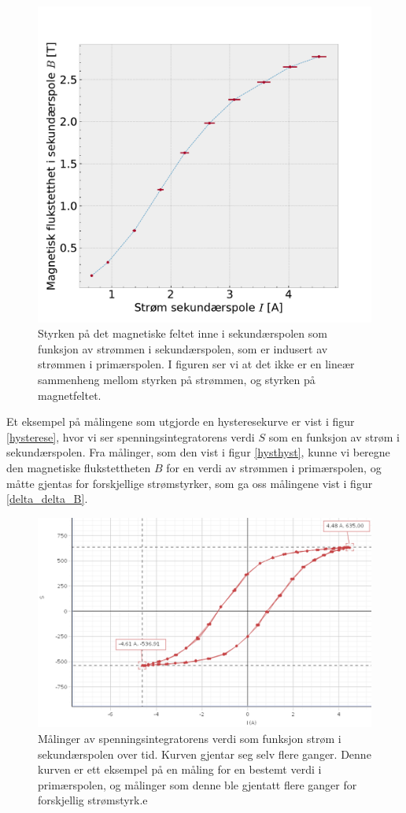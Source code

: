 \documentclass[%
 reprint,
 amsmath,amssymb,
 aps,
 norsk,
]{revtex4-1}
\begin{document}
\begin{figure}[h!]
  \centering
  \includegraphics[scale=0.45]{magnetic_secondary_hysterese.pdf}
  \caption{Styrken på det magnetiske feltet inne i sekundærspolen som funksjon av strømmen i sekundærspolen, som er indusert av strømmen i primærspolen. I figuren ser vi at det ikke er en lineær sammenheng mellom styrken på strømmen, og styrken på magnetfeltet.}
  \label{data_delta_B}
\end{figure}
Et eksempel på målingene som utgjorde en hysteresekurve er vist i figur \vref{hysterese}, hvor vi ser spenningsintegratorens verdi $S$ som en funksjon av strøm i sekundærspolen. Fra målinger, som den vist i figur \vref{hysthyst}, kunne vi beregne den magnetiske flukstettheten $B$ for en verdi av strømmen i primærspolen, og måtte gjentas for forskjellige strømstyrker, som ga oss målingene vist i figur \vref{delta_delta_B}.
\begin{figure}[h!]
  \centering
  \includegraphics[scale=0.25]{Hysterese.png}
  \caption{Målinger av spenningsintegratorens verdi som funksjon strøm i sekundærspolen over tid. Kurven gjentar seg selv flere ganger. Denne kurven er ett eksempel på en måling for en bestemt verdi i primærspolen, og målinger som denne ble gjentatt flere ganger for forskjellig strømstyrk.e}
  \label{hysthyst}
\end{figure}
\end{document}
